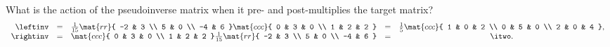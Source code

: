 What is the action of the pseudoinverse matrix when it pre- and post-multiplies the target matrix?
\begin{equation}
  \begin{array}{rcccc}
    \leftinv&=&
    \frac{1}{15}
  \mat{rr}
  {
 -2 & 3 \\
  5 & 0 \\
 -4 & 6
  }
  \mat{ccc}
  {
  0 & 3 & 0 \\
  1 & 2 & 2
  } &=&
  \frac{1}{5}
  \mat{ccc}
  {
 1 & 0 & 2 \\
 0 & 5 & 0 \\
 2 & 0 & 4
  },\\
    \rightinv&=&
  \mat{ccc}
  {
  0 & 3 & 0 \\
  1 & 2 & 2
  } 
    \frac{1}{15}
    \mat{rr}
  {
 -2 & 3 \\
  5 & 0 \\
 -4 & 6
  }
&=& \itwo.
  \end{array}
  \label{eq:gen:lr}
\end{equation}


